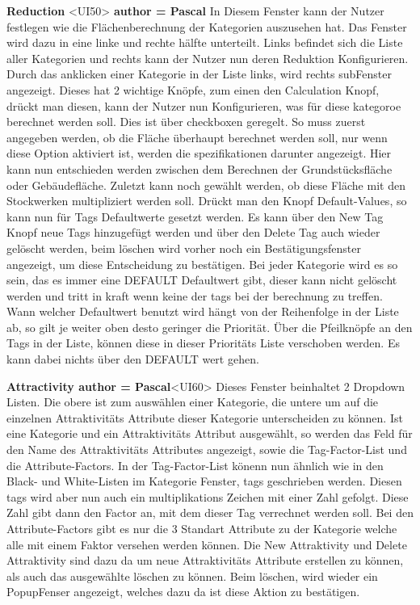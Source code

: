 \documentclass[parskip=full]{scrartcl} %
\begin{document}
\textbf{Reduction }<UI50>\textbf{ author = Pascal}
In Diesem Fenster kann der Nutzer festlegen wie die Flächenberechnung der Kategorien auszusehen hat.
Das Fenster wird dazu in eine linke und rechte hälfte unterteilt.
Links befindet sich die Liste aller Kategorien und rechts kann der Nutzer nun deren Reduktion Konfigurieren.
Durch das anklicken einer Kategorie in der Liste links, wird rechts subFenster angezeigt. Dieses hat 2 wichtige Knöpfe, zum einen den Calculation Knopf, drückt man diesen, kann der Nutzer nun Konfigurieren, was für diese kategoroe berechnet werden soll. Dies ist über checkboxen geregelt. So muss zuerst angegeben werden, ob die Fläche überhaupt berechnet werden soll, nur wenn diese Option aktiviert ist, werden die spezifikationen darunter angezeigt. Hier kann nun entschieden werden zwischen dem Berechnen der Grundstücksfläche oder Gebäudefläche. Zuletzt kann noch gewählt werden, ob diese Fläche mit den Stockwerken multipliziert werden soll.
Drückt man den Knopf Default-Values, so kann nun für Tags Defaultwerte gesetzt werden. Es kann über den New Tag Knopf neue Tags hinzugefügt werden und über den Delete Tag auch wieder gelöscht werden, beim löschen wird vorher noch ein Bestätigungsfenster angezeigt, um diese Entscheidung zu bestätigen.
Bei jeder Kategorie wird es so sein, das es immer eine DEFAULT Defaultwert gibt, dieser kann nicht gelöscht werden und tritt in kraft wenn keine der tags bei der berechnung zu treffen.
Wann welcher Defaultwert benutzt wird hängt von der Reihenfolge in der Liste ab, so gilt je weiter oben desto geringer die Priorität. Über die Pfeilknöpfe an den Tags in der Liste, können diese in dieser Prioritäts Liste verschoben werden. Es kann dabei nichts über den DEFAULT wert gehen.

\textbf{Attractivity author = Pascal}<UI60>
Dieses Fenster beinhaltet 2 Dropdown Listen. Die obere ist zum auswählen einer Kategorie, die untere um auf die einzelnen Attraktivitäts Attribute dieser Kategorie unterscheiden zu können.
Ist eine Kategorie und ein Attraktivitäts Attribut ausgewählt, so werden das Feld für den Name des Attraktivitäts Attributes angezeigt, sowie die Tag-Factor-List und die Attribute-Factors.
In der Tag-Factor-List könenn nun ähnlich wie in den Black- und White-Listen im Kategorie Fenster, tags geschrieben werden. Diesen tags wird aber nun auch ein multiplikations Zeichen mit einer Zahl gefolgt. Diese Zahl gibt dann den Factor an, mit dem dieser Tag verrechnet werden soll.
Bei den Attribute-Factors gibt es nur die 3 Standart Attribute zu der Kategorie welche alle mit einem Faktor versehen werden können.
Die New Attraktivity und Delete Attraktivity sind dazu da um neue Attraktivitäts Attribute erstellen zu können, als auch das ausgewählte löschen zu können. Beim löschen, wird wieder ein PopupFenser angezeigt, welches dazu da ist diese Aktion zu bestätigen.
\end{document}
